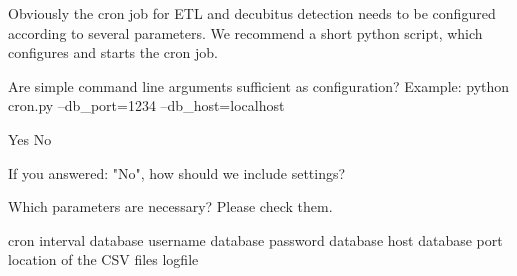 \documentclass{exam}
\begin{document}
Obviously the cron job for ETL and decubitus detection needs to be configured according to several parameters. 
We recommend a short python script, which configures and starts the cron job. 


\begin{questions}

	\question Are simple command line arguments sufficient as configuration? Example: python cron.py --db\_port=1234 --db\_host=localhost

	\begin{checkboxes}
		\choice	Yes
		\choice	No
	\end{checkboxes}

	If you answered: "No", how should we include settings?

	\vspace{3cm}

	\question Which parameters are necessary? Please check them.

	\begin{checkboxes}
		\choice cron interval
		\choice database username
		\choice database password
		\choice database host
		\choice database port
		\choice location of the CSV files
		\choice logfile
	\end{checkboxes}
\end{questions}
\end{document}

